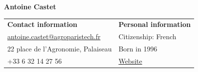 \documentclass[
]{resume}
\author{}
\date{\vspace{-2.5em}}
\begin{document}
\vspace{-2.25cm}

\begin{center}
\LARGE{\bfseries Antoine Castet}\\
\vspace{0.2cm}
\normalsize
\end{center}
\vspace{0.2cm}

\noindent

\begin{tabular}{p{} p{}}
\textbf{Contact information} & \textbf{Personal information} \\
\href{mailto:antoine.castet@agroparistech.fr}{antoine.castet@agroparistech.fr} & Citizenship: French \\
22 place de l’Agronomie, Palaiseau & Born in 1996 \\
+33 6 32 14 27 56 &  \href{https://antoinecastet.github.io/AntoineCastet/}{Website} \\

\end{tabular}
\vspace{0.2cm}
\end{document}
